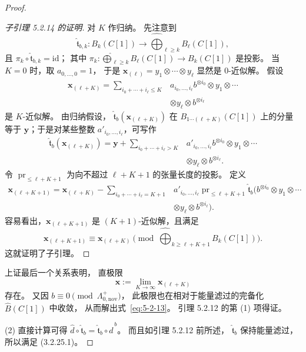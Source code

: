 \begin{proof}
\begin{proof}[子引理 5.2.14 的证明]
对 $K$ 作归纳。
先注意到
\[
\widehat{\mathfrak t}_{b,k}:
B_k(C[1])\longrightarrow
\widehat{\bigoplus}_{\ell\geq k}B_\ell(C[1]),
\]
且 $\pi_k\circ\widehat{\mathfrak t}_{b,k}
=\mathrm{id}$；
其中 $\pi_k:\widehat{\bigoplus}_{\ell\geq k}
B_\ell(C[1])\to B_k(C[1])$ 是投影。
当 $K=0$ 时，取 $a_{0,\ldots,0}=1$，
于是
$\mathbf x_{(\ell)}=y_1\otimes\cdots\otimes y_\ell$
显然是 $0$-近似解。
假设
\[
\begin{aligned}
\mathbf x_{(\ell+K)}
=\sum_{i_0+\cdots+i_\ell\leq K}
&a_{i_0,\ldots,i_\ell}
b^{\otimes i_0}\otimes y_1\otimes\cdots\\
&\otimes y_\ell\otimes b^{\otimes i_\ell}
\end{aligned}
\]
是 $K$-近似解。
由归纳假设，
$\widehat{\mathfrak t}_b(\mathbf x_{(\ell+K)})$
在 $B_{1\cdots(\ell+K)}(C[1])$ 上的分量
等于 $\mathbf y$；于是对某些整数
$a'_{i_0,\ldots,i_\ell}$，可写作
\[
\begin{aligned}
\widehat{\mathfrak t}_b(\mathbf x_{(\ell+K)})
=\mathbf y+
\sum_{i_0+\cdots+i_\ell>K}
&a'_{i_0,\ldots,i_\ell}
b^{\otimes i_0}\otimes y_1\otimes\cdots\\
&\otimes y_\ell\otimes b^{\otimes i_\ell}.
\end{aligned}
\]
令 $\operatorname{pr}_{\leq\ell+K+1}$
为向不超过 $\ell+K+1$ 的张量长度的投影。
定义
\[
\begin{aligned}
\mathbf x_{(\ell+K+1)}
=\mathbf x_{(\ell+K)}-
\sum_{i_0+\cdots+i_\ell=K+1}
&a'_{i_0,\ldots,i_\ell}
\operatorname{pr}_{\leq\ell+K+1}
\widehat{\mathfrak t}_b\bigl(
b^{\otimes i_0}\otimes y_1\otimes\cdots\\
&\otimes y_\ell\otimes b^{\otimes i_\ell}
\bigr).
\end{aligned}
\]
容易看出，$\mathbf x_{(\ell+K+1)}$
是 $(K+1)$-近似解，且满足
\[
\mathbf x_{(\ell+K+1)}
\equiv\mathbf x_{(\ell+K)}
\pmod{\widehat{\bigoplus}_{k\geq\ell+K+1}B_k(C[1])}.
\]
这就证明了子引理。
\end{proof}

上证最后一个关系表明，
直极限
\[
\mathbf x:=\lim_{K\to\infty}
\mathbf x_{(\ell+K)}
\]
存在。
又因 $b\equiv0\pmod{\Lambda_{0,\mathrm{nov}}^+}$，
此极限也在相对于能量滤过的完备化
$\widehat B(C[1])$ 中收敛，
从而解出式~\eqref{eq:5-2-13}。
引理 5.2.12 的第 \textup{(1)} 项得证。

\textup{(2)} 直接计算可得
$\widehat d\circ\widehat{\mathfrak t}_b
=\widehat{\mathfrak t}_b\circ\widehat d^{\,b}$。
而且如引理 5.2.12 前所述，
$\widehat{\mathfrak t}_b$ 保持能量滤过，
所以满足 (3.2.25.1)。
\end{proof}

